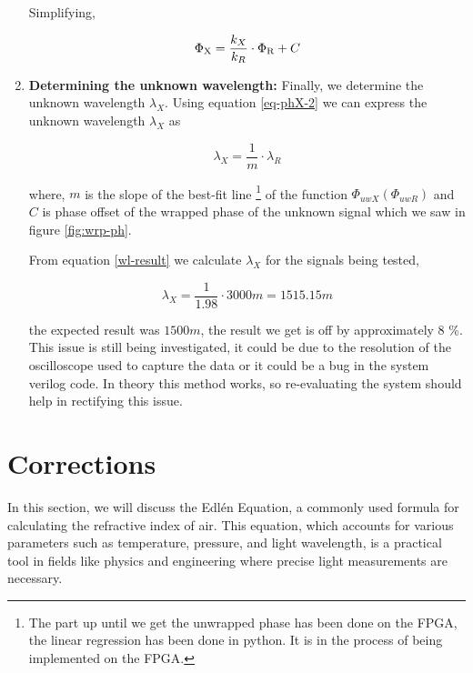 \documentclass[12pt, twoside]{report}
\begin{document}
\begin{enumerate}
Simplifying,

\begin{equation}
\Phi_{\text X} = \frac{k_X}{k_R} \cdot \Phi_{\text R} + C
\label{eq-phX-2}
\end{equation}

\item \textbf{Determining the unknown wavelength:} Finally, we determine the unknown wavelength $\lambda_X$. Using equation \ref{eq-phX-2} we can express the unknown wavelength $\lambda_X$ as

\begin{equation}
    \lambda_X = \frac{1}{m} \cdot \lambda_R 
    \label{wl-result}
\end{equation}

where, $m$ is the slope of the best-fit line \footnote{The part up until we get the unwrapped phase has been done on the FPGA, the linear regression has been done in python. It is in the process of being implemented on the FPGA.} of the function $\Phi_{uwX}(\Phi_{uwR})$ and $C$ is phase offset of the wrapped phase of the unknown signal which we saw in figure \ref{fig:wrp-ph}.

From equation \ref{wl-result} we calculate $\lambda_X$ for the signals being tested, 

\begin{equation}
    \lambda_X = \frac{1}{1.98} \cdot 3000m = 1515.15 m
\end{equation}

the expected result was $1500 m$, the result we get is off by approximately 8 \%. This issue is still being investigated, it could be due to the resolution of the oscilloscope used to capture the data or it could be a bug in the system verilog code. In theory this method works, so re-evaluating the system should help in rectifying this issue.

\end{enumerate}

\section{Corrections}\label{wavel-extraction}

In this section, we will discuss the Edlén Equation, a commonly used formula for calculating the refractive index of air. This equation, which accounts for various parameters such as temperature, pressure, and light wavelength, is a practical tool in fields like physics and engineering where precise light measurements are necessary.
\end{document}
